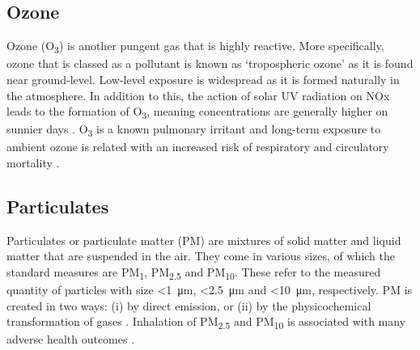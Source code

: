 \documentclass[11pt]{report}
\begin{document}
%


\subsection{Ozone}

Ozone (O\textsubscript{3}) is another pungent gas that is highly reactive. More specifically, ozone that is classed as a pollutant is known as `tropospheric ozone' as it is found near ground-level. Low-level exposure is widespread as it is formed naturally in the atmosphere. In addition to this, the action of solar UV radiation on NOx leads to the formation of O\textsubscript{3}, meaning concentrations are generally higher on sunnier days \citep{Brook2004cardiostmnt}. O\textsubscript{3} is a known pulmonary irritant \citep{Ebi2008ozonePMhealth} and long-term exposure to ambient ozone is related with an increased risk of respiratory and circulatory mortality \citep{Turner2016ozonemortality}.

\subsection{Particulates}

Particulates or particulate matter (PM) are mixtures of solid matter and liquid matter that are suspended in the air. They come in various sizes, of which the standard measures are PM\textsubscript{1}, PM\textsubscript{2.5} and PM\textsubscript{10}. These refer to the measured quantity of particles with size \textless \SI{1}{\micro\metre}, \textless \SI{2.5}{\micro\metre} and \textless \SI{10}{\micro\metre}, respectively. PM is created in two ways: (i) by direct emission, or (ii) by the physicochemical transformation of gases \citep{Brook2004cardiostmnt}. Inhalation of PM\textsubscript{2.5} and PM\textsubscript{10} is associated with many adverse health outcomes \citep{pope1995particulate,pope2002lungcancercardiomortality,Anderson2012clearingtheair,Beelen2014escapeproject}.
\end{document}
